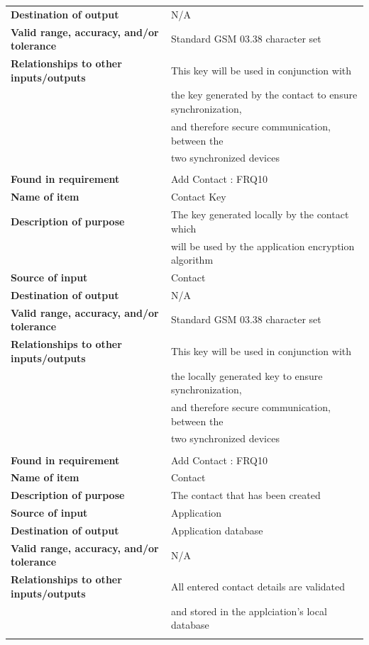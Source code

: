 \begin{tabular}{ll}
\textbf{Destination of output}&N/A\\
\textbf{Valid range, accuracy, and/or tolerance}&Standard GSM 03.38 character set\\
\textbf{Relationships to other inputs/outputs}&This key will be used in conjunction with\\& the key generated by the contact to ensure synchronization,\\& and therefore secure communication, between the\\& two synchronized devices\\
&\\
\textbf{Found in requirement}&Add Contact : FRQ10\\
\textbf{Name of item}&Contact Key\\
\textbf{Description of purpose}&The key generated locally by the contact which\\& will be used by the application encryption algorithm\\
\textbf{Source of input}&Contact\\
\textbf{Destination of output}&N/A\\
\textbf{Valid range, accuracy, and/or tolerance}&Standard GSM 03.38 character set\\
\textbf{Relationships to other inputs/outputs}&This key will be used in conjunction with\\& the locally generated key to ensure synchronization,\\& and therefore secure communication, between the\\& two synchronized devices\\
&\\
\textbf{Found in requirement}&Add Contact : FRQ10\\
\textbf{Name of item}&Contact\\
\textbf{Description of purpose}&The contact that has been created\\
\textbf{Source of input}&Application\\
\textbf{Destination of output}&Application database\\
\textbf{Valid range, accuracy, and/or tolerance}&N/A\\
\textbf{Relationships to other inputs/outputs}&All entered contact details are validated\\& and stored in the applciation's local database\\
&\\
\end{tabular}
